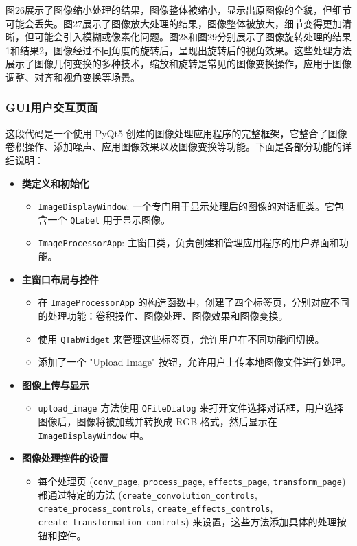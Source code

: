 \documentclass[a4paper,12pt]{article}
\begin{document}
图26展示了图像缩小处理的结果，图像整体被缩小，显示出原图像的全貌，但细节可能会丢失。图27展示了图像放大处理的结果，图像整体被放大，细节变得更加清晰，但可能会引入模糊或像素化问题。图28和图29分别展示了图像旋转处理的结果1和结果2，图像经过不同角度的旋转后，呈现出旋转后的视角效果。这些处理方法展示了图像几何变换的多种技术，缩放和旋转是常见的图像变换操作，应用于图像调整、对齐和视角变换等场景。

\clearpage
\subsubsection{GUI用户交互页面}
这段代码是一个使用 PyQt5 创建的图像处理应用程序的完整框架，它整合了图像卷积操作、添加噪声、应用图像效果以及图像变换等功能。下面是各部分功能的详细说明：

\begin{itemize}
    \item \textbf{类定义和初始化}
    \begin{itemize}
        \item \texttt{ImageDisplayWindow}: 一个专门用于显示处理后的图像的对话框类。它包含一个 \texttt{QLabel} 用于显示图像。
        \item \texttt{ImageProcessorApp}: 主窗口类，负责创建和管理应用程序的用户界面和功能。
    \end{itemize}

    \item \textbf{主窗口布局与控件}
    \begin{itemize}
        \item 在 \texttt{ImageProcessorApp} 的构造函数中，创建了四个标签页，分别对应不同的处理功能：卷积操作、图像处理、图像效果和图像变换。
        \item 使用 \texttt{QTabWidget} 来管理这些标签页，允许用户在不同功能间切换。
        \item 添加了一个 "Upload Image" 按钮，允许用户上传本地图像文件进行处理。
    \end{itemize}

    \item \textbf{图像上传与显示}
    \begin{itemize}
        \item \texttt{upload\_image} 方法使用 \texttt{QFileDialog} 来打开文件选择对话框，用户选择图像后，图像将被加载并转换成 RGB 格式，然后显示在 \texttt{ImageDisplayWindow} 中。
    \end{itemize}

    \item \textbf{图像处理控件的设置}
    \begin{itemize}
        \item 每个处理页 (\texttt{conv\_page}, \texttt{process\_page}, \texttt{effects\_page}, \texttt{transform\_page}) 都通过特定的方法 (\texttt{create\_convolution\_controls}, \texttt{create\_process\_controls}, \texttt{create\_effects\_controls}, \texttt{create\_transformation\_controls}) 来设置，这些方法添加具体的处理按钮和控件。
    \end{itemize}


\end{itemize}
\end{document}
